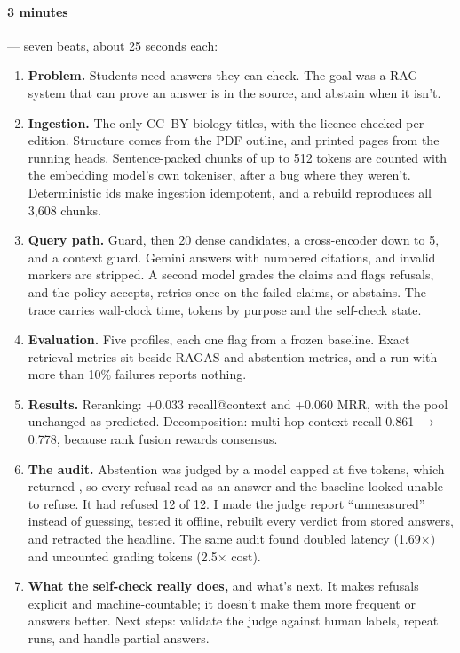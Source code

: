 \paragraph{3 minutes} --- seven beats, about 25 seconds each:
\begin{enumerate}
  \item \textbf{Problem.} Students need answers they can check. The goal was a RAG system that can prove an answer is in the source, and abstain when it isn't.
  \item \textbf{Ingestion.} The only CC~BY biology titles, with the licence checked per edition. Structure comes from the PDF outline, and printed pages from the running heads. Sentence-packed chunks of up to 512 tokens are counted with the embedding model's own tokeniser, after a bug where they weren't. Deterministic ids make ingestion idempotent, and a rebuild reproduces all 3,608 chunks.
  \item \textbf{Query path.} Guard, then 20 dense candidates, a cross-encoder down to 5, and a context guard. Gemini answers with numbered citations, and invalid markers are stripped. A second model grades the claims and flags refusals, and the policy accepts, retries once on the failed claims, or abstains. The trace carries wall-clock time, tokens by purpose and the self-check state.
  \item \textbf{Evaluation.} Five profiles, each one flag from a frozen baseline. Exact retrieval metrics sit beside RAGAS and abstention metrics, and a run with more than 10\% failures reports nothing.
  \item \textbf{Results.} Reranking: +0.033 recall@context and +0.060 MRR, with the pool unchanged as predicted. Decomposition: multi-hop context recall 0.861 $\rightarrow$ 0.778, because rank fusion rewards consensus.
  \item \textbf{The audit.} Abstention was judged by a model capped at five tokens, which returned , so every refusal read as an answer and the baseline looked unable to refuse. It had refused 12 of 12. I made the judge report ``unmeasured'' instead of guessing, tested it offline, rebuilt every verdict from stored answers, and retracted the headline. The same audit found doubled latency (1.69$\times$) and uncounted grading tokens (2.5$\times$ cost).
  \item \textbf{What the self-check really does,} and what's next. It makes refusals explicit and machine-countable; it doesn't make them more frequent or answers better. Next steps: validate the judge against human labels, repeat runs, and handle partial answers.
\end{enumerate}

